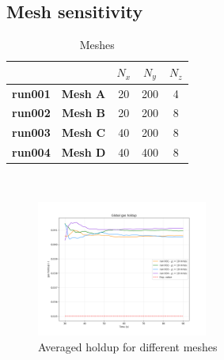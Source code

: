 \documentclass[11pt,a4paper]{article}
\begin{document}
\subsection{Mesh sensitivity}
\label{sub:mesh_sensitivity}

\begin{table}[H]
    \centering 
    \begin{tabular}{|p{5em} c c c c |}
    \hline
    \rowcolor{bluePoli!40}
    & & \textbf{$N_x$} & \textbf{$N_y$} & \textbf{$N_z$} \T\B \\
    \hline \hline
    \textbf{run001} & \textbf{Mesh A} & 20 & 200 & 4 \T\B \\
    \textbf{run002} &\textbf{Mesh B} & 20 & 200 & 8 \T\B \\
    \textbf{run003} &\textbf{Mesh C} & 40 & 200 & 8 \T\B \\
    \textbf{run004} &\textbf{Mesh D} & 40 & 400 & 8 \T\B \\
    \hline
    \end{tabular}
    \\[10pt]
    \caption{Meshes}
    \label{table:meshes}
\end{table}

\begin{figure}[H]
    \centering
    \includegraphics[width=0.5\textwidth]{Images/graphs/mesh/holdUp10.png}
    \caption{Averaged holdup for different meshes}
    \label{fig:holdup_mesh}
\end{figure}
\end{document}
